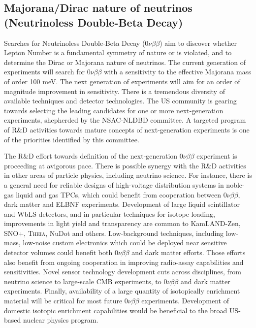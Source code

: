 \subsection{Majorana/Dirac nature of neutrinos (Neutrinoless
  Double-Beta Decay)}

Searches for Neutrinoless Double-Beta Decay
($0\nu\beta\beta$) aim to discover whether Lepton Number is a
fundamental symmetry of nature or is violated, and to determine the Dirac or
Majorana nature of neutrinos. The current generation of experiments
will search for $0\nu\beta\beta$  with a sensitivity to the effective Majorana
mass of order 100 meV. The next generation of experiments will aim for
an order of magnitude improvement in sensitivity. There is a
tremendous diversity of available techniques and detector
technologies. The US community is gearing towards selecting the
leading candidates for one or more next-generation experiments,
shepherded by the NSAC-NLDBD committee. A targeted program of R\&D
activities towards mature concepts of next-generation experiments
is one of the priorities identified by this committee. 

The R\&D effort towards definition of the next-generation
$0\nu\beta\beta$ experiment is proceeding at avigorous pace. There is
possible synergy with the R\&D activities in other areas of particle
physics, including neutrino science. For instance, there is a general
need for reliable designs of high-voltage distribution systems in
noble-gas liquid and gas TPCs, which could benefit from cooperation
between $0\nu\beta\beta$, dark matter and ELBNF
experiments. Development of large liquid scintillator and WbLS
detectors, and in particular techniques for isotope loading,
improvements in light yield and transparency are common to
KamLAND-Zen, SNO+, \textsc{Theia}, NuDot and others. Low-background techniques,
including low-mass, low-noise custom electronics which could be
deployed near sensitive detector volumes could benefit both
$0\nu\beta\beta$ and dark matter efforts. Those efforts also benefit
from ongoing cooperation in improving radio-assay capabilities and
sensitivities. Novel sensor technology development cuts across
disciplines, from neutrino science to large-scale CMB experiments, to
$0\nu\beta\beta$ and dark matter experiments. Finally, availability of
a large quantity of isotopically enrichment material will be critical
for most future $0\nu\beta\beta$ experiments. Development of 
domestic isotopic enrichment capabilities would be beneficial to the
broad US-based nuclear physics program.
